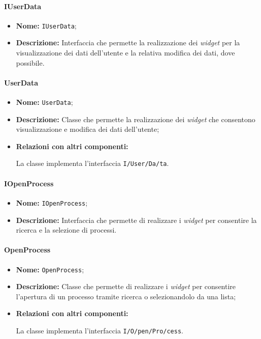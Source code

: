\paragraph{IUserData}
\begin{itemize}
\item \textbf{Nome:} \texttt{IUserData};
\item \textbf{Descrizione:} Interfaccia che permette la realizzazione dei \textit{widget} per la visualizzazione dei dati dell'utente e la relativa modifica dei dati, dove possibile.
\end{itemize}

\paragraph{UserData}
\begin{flushleft}
\begin{itemize}
\item \textbf{Nome:} \texttt{UserData};
\item \textbf{Descrizione:} Classe che permette la realizzazione dei \textit{widget} che consentono visualizzazione e modifica dei dati dell'utente;
\item \textbf{Relazioni con altri componenti:}
\begin{sloppypar}
La classe implementa l'interfaccia \texttt{I\fshyp{}User\fshyp{}Da\fshyp{}ta}.
\end{sloppypar}
\end{itemize}
\end{flushleft}

\paragraph{IOpenProcess}
\begin{itemize}
\item \textbf{Nome:} \texttt{IOpenProcess};
\item \textbf{Descrizione:} Interfaccia che permette di realizzare i \textit{widget} per consentire la ricerca e la selezione di processi.
\end{itemize}

\paragraph{OpenProcess}
\begin{flushleft}
\begin{itemize}
\item \textbf{Nome:} \texttt{OpenProcess};
\item \textbf{Descrizione:} Classe che permette di realizzare i \textit{widget} per consentire l'apertura di un processo tramite ricerca o selezionandolo da una lista;
\item \textbf{Relazioni con altri componenti:}
\begin{sloppypar}
La classe implementa l'interfaccia \texttt{I\fshyp{}O\fshyp{}pen\fshyp{}Pro\fshyp{}cess}.
\end{sloppypar}
\end{itemize}
\end{flushleft}

